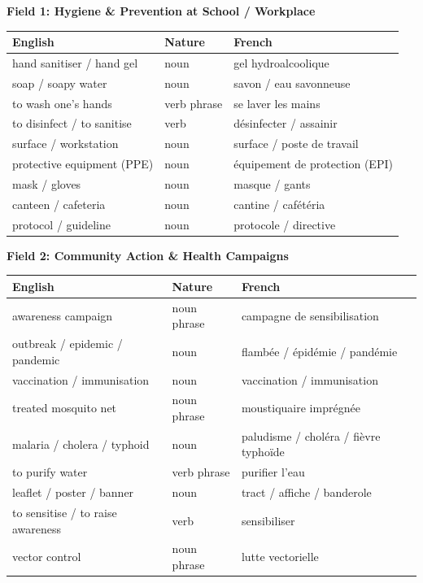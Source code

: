 \documentclass[11pt]{article}
\begin{document}
\begin{definition}
\textbf{Field 1: Hygiene \& Prevention at School / Workplace}
\begin{center}
\begin{tabularx}{\linewidth}{|l|l|X|}
\hline
\rowcolor{popblueL} English & Nature & French \\
\hline
hand sanitiser / hand gel & noun & gel hydroalcoolique \\
\hline
soap / soapy water & noun & savon / eau savonneuse \\
\hline
to wash one's hands & verb phrase & se laver les mains \\
\hline
to disinfect / to sanitise & verb & désinfecter / assainir \\
\hline
surface / workstation & noun & surface / poste de travail \\
\hline
protective equipment (PPE) & noun & équipement de protection (EPI) \\
\hline
mask / gloves & noun & masque / gants \\
\hline
canteen / cafeteria & noun & cantine / cafétéria \\
\hline
protocol / guideline & noun & protocole / directive \\
\hline
\end{tabularx}
\end{center}

\textbf{Field 2: Community Action \& Health Campaigns}
\begin{center}
\begin{tabularx}{\linewidth}{|l|l|X|}
\hline
\rowcolor{popgreenL} English & Nature & French \\
\hline
awareness campaign & noun phrase & campagne de sensibilisation \\
\hline
outbreak / epidemic / pandemic & noun & flambée / épidémie / pandémie \\
\hline
vaccination / immunisation & noun & vaccination / immunisation \\
\hline
treated mosquito net & noun phrase & moustiquaire imprégnée \\
\hline
malaria / cholera / typhoid & noun & paludisme / choléra / fièvre typhoïde \\
\hline
to purify water & verb phrase & purifier l'eau \\
\hline
leaflet / poster / banner & noun & tract / affiche / banderole \\
\hline
to sensitise / to raise awareness & verb & sensibiliser \\
\hline
vector control & noun phrase & lutte vectorielle \\
\hline
\end{tabularx}
\end{center}
\end{definition}
\end{document}

